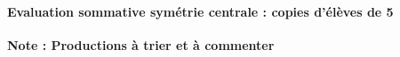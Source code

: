 \paragraph{Evaluation sommative symétrie centrale : copies d'élèves de 5\\}
\textbf{\color{red}Note : Productions à trier et à commenter}
\begin{figure}[!h]
	\centering
	\qquad

\end{figure}
